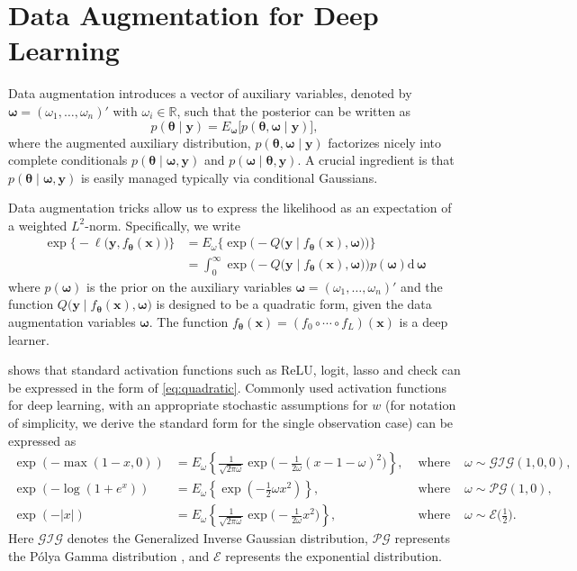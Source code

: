 \documentclass[ba]{imsart}
\newcommand{\bm}[1]{\boldsymbol{#1}}
\renewcommand{\d}{\mathrm{d}}
\def\pg{{\mathcal{PG}}}
\def\gig{{\mathcal{GIG}}}
\def\mE{{\mathcal{E}}}
\def\bomega{\bm{\omega}}
\def\x{\bm{x}}
\def\y{\bm{y}}
\def\btheta{\bm{\theta}}
\renewcommand{\d}{\mathrm{d}\,}
\newcommand{\by}{{\bm y}}
\newcommand{\R}{\mathbb{R}}
\numberwithin{equation}{section}
\theoremstyle{plain}
\begin{document}
\section{Data Augmentation  for Deep Learning}\label{sec:DA}

Data augmentation introduces a vector of auxiliary variables, denoted by  $\bomega=(\omega_1, \ldots, \omega_n)'$ with $\omega_i\in \R$, such that  the posterior can be written as
\[p(\btheta\mid \by)= E_{\bomega} \Big[  p(\btheta,  \bomega\mid \by) \Big],\] 
where the augmented auxiliary  distribution, $p(\btheta, \bomega  \mid \by)$ factorizes  nicely   into complete conditionals $p(\btheta \mid \bomega,  \by)$ and $p(\bomega\mid  \btheta,  \by)$. A crucial ingredient is that $p(\btheta\mid \bomega,  \by) $ is easily managed typically via conditional Gaussians. 

Data augmentation tricks allow us to express the likelihood  as an expectation of a weighted $L^2$-norm. Specifically, we write
\begin{align*}
\exp\Big\{-\ell\big(\y, f_{\btheta}(\x)\big)\Big\}&=E_\omega \Big\{\exp\Big(-Q\big( \y \mid f_{\btheta}(\x),\bomega \big)\Big)\Big\}\\
&=\int_0^\infty \exp\Big(-Q\big( \y\mid f_{\btheta}(\x),\bomega \big)\Big)p(\bomega)\d\bomega
\end{align*}
where $p(\bomega)$ is the prior on the auxiliary variables $\bomega=(\omega_1, \ldots, \omega_n)'$ and the function $Q\big(  \y \mid f_{\btheta}(\x), \bomega\big)$ is designed to be a quadratic form, given the data augmentation variables $\bomega$. The function $f_{\btheta}(\x) = (f_0 \circ \cdots \circ f_L)(\x)$ is a deep learner.


  shows that standard activation functions such as ReLU, logit, lasso and check can be expressed in the form of  \eqref{eq:quadratic}. Commonly used activation functions for deep learning, with an appropriate stochastic assumptions for $w$ (for notation of simplicity, we derive the standard form for the single observation case) can be expressed as 
\begin{align*}
\exp(-\max(1-x,0))&=E_\omega \left\{\frac{1}{\sqrt{2\pi\omega}}\exp\Big(-\frac{1}{2\omega}(x-1-\omega)^2\Big)  \right\},  &\text{ where } & \omega \sim \gig(1,0,0), \\
\exp(-\log(1+e^{x}))&=E_\omega \left\{\exp(-\frac{1}{2}\omega x^2 ) \right\}, &\text{ where }& \omega \sim \pg(1,0), \\
\exp(-|x|)&=E_\omega \left\{\frac{1}{\sqrt{2\pi\omega}}\exp\Big(-\frac{1}{2\omega}x^2\Big) \right\}, &\text{ where }& \omega \sim \mE \big(\frac{1}{2}\big).
\end{align*}
Here $\mathcal{GIG}$ denotes the Generalized Inverse Gaussian distribution,  $\pg$ represents the P\'{o}lya Gamma  distribution \citep{polson2013bayesian}, and $\mE$ represents the exponential distribution.
\end{document}
